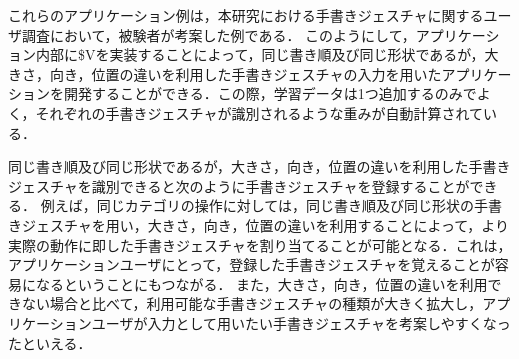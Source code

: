 \clearpage
これらのアプリケーション例は，本研究における手書きジェスチャに関するユーザ調査において，被験者が考案した例である．
このようにして，アプリケーション内部に\$Vを実装することによって，同じ書き順及び同じ形状であるが，大きさ，向き，位置の違いを利用した手書きジェスチャの入力を用いたアプリケーションを開発することができる．この際，学習データは1つ追加するのみでよく，それぞれの手書きジェスチャが識別されるような重みが自動計算されている．


同じ書き順及び同じ形状であるが，大きさ，向き，位置の違いを利用した手書きジェスチャを識別できると次のように手書きジェスチャを登録することができる．
例えば，同じカテゴリの操作に対しては，同じ書き順及び同じ形状の手書きジェスチャを用い，大きさ，向き，位置の違いを利用することによって，より実際の動作に即した手書きジェスチャを割り当てることが可能となる．これは，アプリケーションユーザにとって，登録した手書きジェスチャを覚えることが容易になるということにもつながる．
また，大きさ，向き，位置の違いを利用できない場合と比べて，利用可能な手書きジェスチャの種類が大きく拡大し，アプリケーションユーザが入力として用いたい手書きジェスチャを考案しやすくなったといえる．


